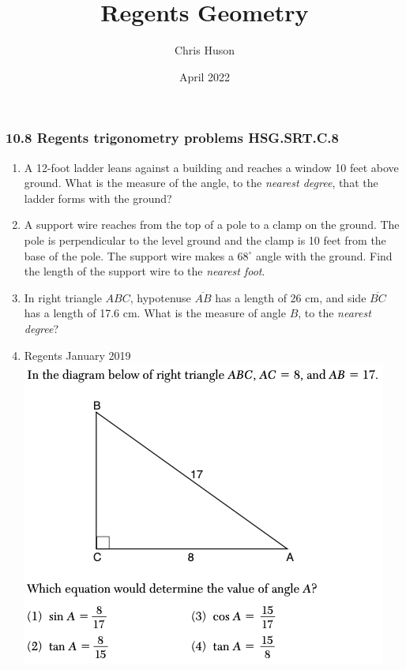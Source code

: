 \documentclass[12pt, twoside]{article}
\title{Regents Geometry}
\author{Chris Huson}
\date{April 2022}
\begin{document}
\subsubsection*{10.8 Regents trigonometry problems \hfill HSG.SRT.C.8}
\begin{enumerate}
  \subsubsection*{Start by sketching the situation for each problem}

\item A 12-foot ladder leans against a building and reaches a window 10 feet above ground. What is the measure of the angle, to the \emph{nearest degree}, that the ladder forms with the ground? \vspace{5cm}

\item A support wire reaches from the top of a pole to a clamp on the ground. The pole is perpendicular to the level ground and the clamp is 10 feet from the base of the pole. The support wire makes a $68^\circ$ angle with the ground. Find the length of the support wire to the \emph{nearest foot}. \vspace{6cm}

\item In right triangle $ABC$, hypotenuse $\overline{AB}$ has a length of 26 cm, and side $\overline{BC}$ has a length of 17.6 cm. What is the measure of angle $B$, to the \emph{nearest degree}?

\newpage
\item Regents January 2019\\
 \includegraphics[scale=0.65]{Pyth+trig_17_Jan2019.png}


\end{enumerate}
\end{document}
